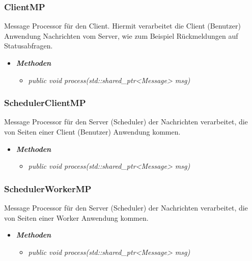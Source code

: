 \documentclass[a4paper,12pt]{article}
\begin{document}
\subsubsection{ClientMP}

Message Processor für den Client. Hiermit verarbeitet die Client (Benutzer) Anwendung Nachrichten vom Server, wie zum Beispiel Rückmeldungen auf Statusabfragen.

	\begin{itemize}[label={}]

	\item\textit{\textbf{Methoden}}
		\begin{itemize}[label={\textbullet}]
			\item\textit{public void process(std::shared\_ptr<Message> msg)}

		\end{itemize}

\end{itemize}


\subsubsection{SchedulerClientMP}

Message Processor für den Server (Scheduler) der Nachrichten verarbeitet, die von Seiten einer Client (Benutzer) Anwendung kommen.

	\begin{itemize}[label={}]

	\item\textit{\textbf{Methoden}}
		\begin{itemize}[label={\textbullet}]
			\item\textit{public void process(std::shared\_ptr<Message> msg)}

		\end{itemize}

\end{itemize}


\subsubsection{SchedulerWorkerMP}

Message Processor für den Server (Scheduler) der Nachrichten verarbeitet, die von Seiten einer Worker Anwendung kommen.

	\begin{itemize}[label={}]

	\item\textit{\textbf{Methoden}}
		\begin{itemize}[label={\textbullet}]
			\item\textit{public void process(std::shared\_ptr<Message> msg)}

		\end{itemize}

\end{itemize}
\end{document}
